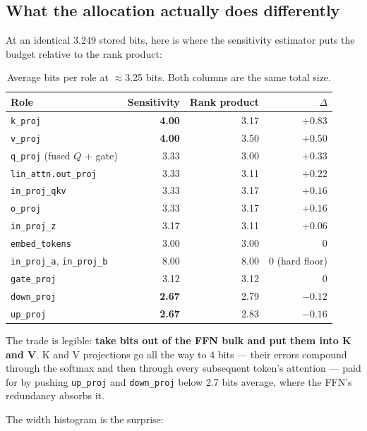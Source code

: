\documentclass[11pt]{article}
\newcommand{\code}[1]{\texttt{#1}}
\begin{document}
\subsection{What the allocation actually does differently}

At an identical 3.249 stored bits, here is where the sensitivity estimator puts the budget
relative to the rank product:

\begin{table}[H]
\centering\small
\caption{Average bits per role at $\approx$3.25 bits. Both columns are the same total size.}
\begin{tabular}{lrrr}
\toprule
Role & Sensitivity & Rank product & $\Delta$ \\
\midrule
\rowcolor{rowtint}
\code{k\_proj} & \textbf{4.00} & 3.17 & $+0.83$ \\
\rowcolor{rowtint}
\code{v\_proj} & \textbf{4.00} & 3.50 & $+0.50$ \\
\code{q\_proj} (fused $Q$ + gate) & 3.33 & 3.00 & $+0.33$ \\
\rowcolor{rowtint}
\code{lin\_attn.out\_proj} & 3.33 & 3.11 & $+0.22$ \\
\code{in\_proj\_qkv} & 3.33 & 3.17 & $+0.16$ \\
\rowcolor{rowtint}
\code{o\_proj} & 3.33 & 3.17 & $+0.16$ \\
\code{in\_proj\_z} & 3.17 & 3.11 & $+0.06$ \\
\rowcolor{rowtint}
\code{embed\_tokens} & 3.00 & 3.00 & $0$ \\
\code{in\_proj\_a}, \code{in\_proj\_b} & 8.00 & 8.00 & $0$ (hard floor) \\
\rowcolor{rowtint}
\code{gate\_proj} & 3.12 & 3.12 & $0$ \\
\code{down\_proj} & \textbf{2.67} & 2.79 & $-0.12$ \\
\rowcolor{rowtint}
\code{up\_proj} & \textbf{2.67} & 2.83 & $-0.16$ \\
\bottomrule
\end{tabular}
\end{table}

The trade is legible: \textbf{take bits out of the FFN bulk and put them into K and V}. K and V
projections go all the way to 4 bits --- their errors compound through the softmax and then
through every subsequent token's attention --- paid for by pushing \code{up\_proj} and
\code{down\_proj} below 2.7 bits average, where the FFN's redundancy absorbs it.

The width histogram is the surprise:
\end{document}
